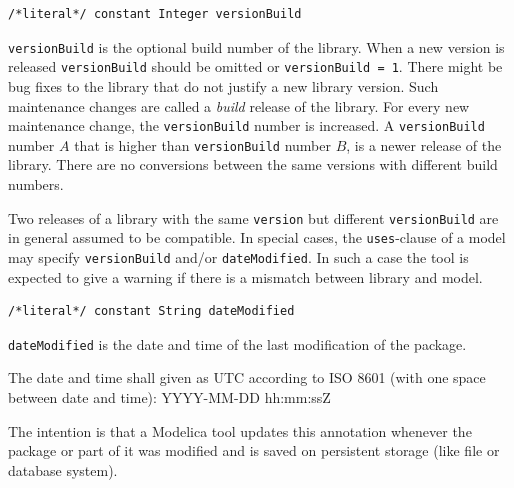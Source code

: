 \begin{annotationdefinition}[versionBuild]
\begin{synopsis}\begin{lstlisting}
/*literal*/ constant Integer versionBuild
\end{lstlisting}\end{synopsis}
\begin{semantics}
\lstinline!versionBuild! is the optional build number of the library.
When a new version is released \lstinline!versionBuild! should be omitted or \lstinline!versionBuild = 1!.
There might be bug fixes to the library that do not justify a new library version.
Such maintenance changes are called a \emph{build} release of the library.
For every new maintenance change, the \lstinline!versionBuild! number is increased.
A \lstinline!versionBuild! number $A$ that is higher than \lstinline!versionBuild! number $B$, is a newer release of the library.
There are no conversions between the same versions with different build numbers.

Two releases of a library with the same \lstinline!version! but different \lstinline!versionBuild! are in general assumed to be compatible.
In special cases, the \lstinline!uses!-clause of a model may specify \lstinline!versionBuild! and/or \lstinline!dateModified!.
In such a case the tool is expected to give a warning if there is a mismatch between library and model.
\end{semantics}
\end{annotationdefinition}

\begin{annotationdefinition}[dateModified]
\begin{synopsis}\begin{lstlisting}
/*literal*/ constant String dateModified
\end{lstlisting}\end{synopsis}
\begin{semantics}
\lstinline!dateModified! is the date and time of the last modification of the package.

The date and time shall given as UTC according to ISO 8601 (with one space between date and time): YYYY-MM-DD hh:mm:ssZ

\begin{nonnormative}
The intention is that a Modelica tool updates this annotation whenever the package or part of it was modified and is saved on persistent storage (like file or database system).
\end{nonnormative}
\end{semantics}
\end{annotationdefinition}

